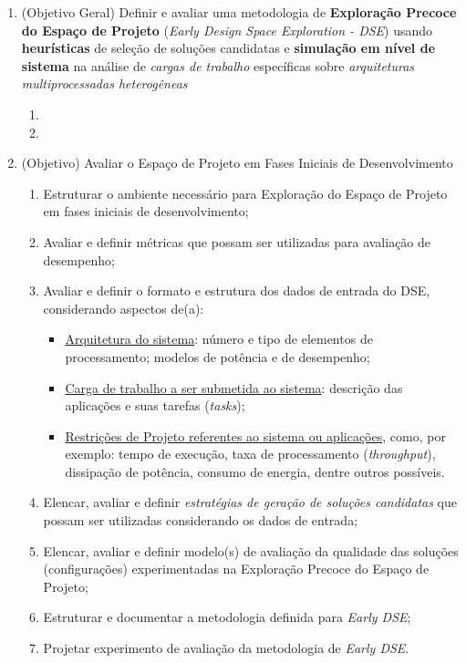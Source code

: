 \documentclass[tese-proposta,nocipinfo]{texufpel}
\begin{document}
\begin{enumerate}[start=0]
\item(Objetivo Geral) Definir e avaliar uma metodologia de \textbf{Exploração Precoce do Espaço de Projeto} (\textit{Early Design Space Exploration - DSE}) usando \textbf{heurísticas} de seleção de soluções candidatas e \textbf{simulação em nível de sistema} na análise de \textit{cargas de trabalho} específicas sobre \textit{arquiteturas multiprocessadas heterogêneas} 

 \begin{enumerate}
     \item {}
     \item {}
 \end{enumerate}
\item(Objetivo) {Avaliar o Espaço de Projeto em Fases Iniciais de Desenvolvimento}
\begin{enumerate}
\item Estruturar o ambiente necessário para Exploração do Espaço de Projeto em fases iniciais de desenvolvimento;
\item Avaliar e definir métricas que possam ser utilizadas para avaliação de desempenho;
\item Avaliar e definir o formato e estrutura dos dados de entrada do DSE, considerando aspectos de(a):
	\begin{itemize}
    	\item \underline{Arquitetura do sistema}: número e tipo de elementos de processamento; modelos de potência e de desempenho;
        \item \underline{Carga de trabalho a ser submetida ao sistema}: descrição das aplicações e suas tarefas (\textit{tasks});
        \item \underline{Restrições de Projeto referentes ao sistema ou aplicações}, como, por exemplo: tempo de execução, taxa de processamento (\textit{throughput}), dissipação de potência, consumo de energia, dentre outros possíveis.
    \end{itemize}
\item Elencar, avaliar e definir \textit{estratégias de geração de soluções candidatas} que possam ser utilizadas considerando os dados de entrada;
\item Elencar, avaliar e definir modelo(s) de avaliação da qualidade das soluções (configurações) experimentadas na Exploração Precoce do Espaço de Projeto;
\item Estruturar e documentar a metodologia definida para \textit{Early DSE};
\item Projetar experimento de avaliação da metodologia de \textit{Early DSE}.
\end{enumerate}


\end{enumerate}
\end{document}
